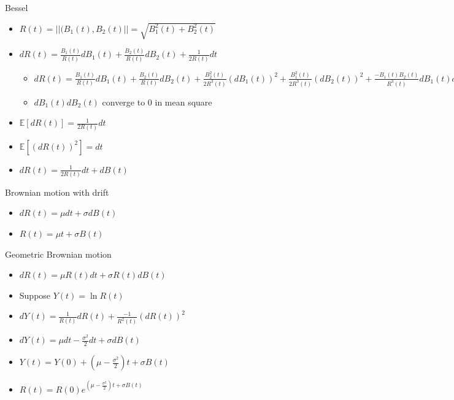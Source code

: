 \documentclass[a4paper]{article}
\begin{document}
\begin{itemize}
        Bessel
        \begin{itemize}
            \item $R(t) = ||(B_1(t), B_2(t)|| = \sqrt{B_1^2(t) + B_2^2(t)}$
            \item $d R(t) = \frac{B_1(t)}{R(t)} dB_1(t) + \frac{B_2(t)}{R(t)} dB_2(t) + \frac{1}{2 R(t)} dt$
                \begin{itemize}
                    \item $d R(t) = \frac{B_1(t)}{R(t)} dB_1(t) + \frac{B_2(t)}{R(t)} dB_2(t) + \frac{B_2^2(t)}{2 R^3(t)} (dB_1(t))^2 + \frac{B_1^2(t)}{2 R^3(t)} (dB_2(t))^2 + \frac{-B_1(t)B_2(t)}{R^3(t)} dB_1(t) dB_2(t)$
                    \item $dB_1(t) dB_2(t)$ converge to $0$ in mean square
                \end{itemize}
            \item $\mathbb{E}[d R(t)] = \frac{1}{2 R(t)} dt$
            \item $\mathbb{E}[(d R(t))^2] = dt$
            \item $d R(t) = \frac{1}{2 R(t)} dt + d B(t)$
        \end{itemize}
        Brownian motion with drift
        \begin{itemize}
            \item $d R(t) = \mu dt + \sigma d B(t)$
            \item $R(t) = \mu t + \sigma B(t)$
        \end{itemize}
        Geometric Brownian motion
        \begin{itemize}
            \item $d R(t) = \mu R(t) dt + \sigma R(t) d B(t)$
            \item Suppose $Y(t) = \ln R(t)$
            \item $d Y(t) = \frac{1}{R(t)} d R(t) + \frac{-1}{R^2(t)} (dR(t))^2$
            \item $d Y(t) = \mu dt - \frac{\sigma^2}{2} dt + \sigma dB(t)$
            \item $Y(t) = Y(0) + (\mu - \frac{\sigma^2}{2})t + \sigma B(t)$
            \item $R(t) = R(0)e^{(\mu - \frac{\sigma^2}{2})t + \sigma B(t)}$
        \end{itemize}
\end{itemize}
\end{document}
